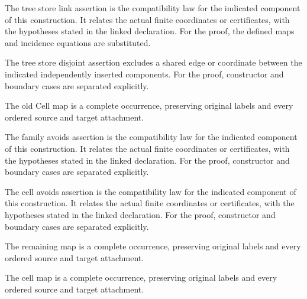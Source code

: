 The tree store link assertion is the compatibility law for the indicated component of this construction. It relates the actual finite coordinates or certificates, with the hypotheses stated in the linked declaration.
For the proof, the defined maps and incidence equations are substituted.
\par{}

The tree store disjoint assertion excludes a shared edge or coordinate between the indicated independently inserted components.
For the proof, constructor and boundary cases are separated explicitly.
\par{}

The old Cell map is a complete occurrence, preserving original labels and every ordered source and target attachment.
\par{}

The family avoids assertion is the compatibility law for the indicated component of this construction. It relates the actual finite coordinates or certificates, with the hypotheses stated in the linked declaration.
For the proof, constructor and boundary cases are separated explicitly.
\par{}

The cell avoids assertion is the compatibility law for the indicated component of this construction. It relates the actual finite coordinates or certificates, with the hypotheses stated in the linked declaration.
For the proof, constructor and boundary cases are separated explicitly.
\par{}

The remaining map is a complete occurrence, preserving original labels and every ordered source and target attachment.
\par{}

The cell map is a complete occurrence, preserving original labels and every ordered source and target attachment.
\par{}

